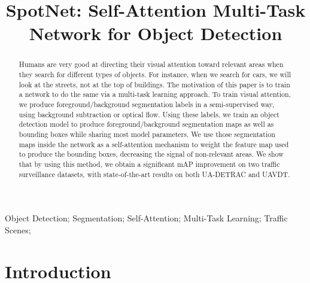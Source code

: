 \documentclass[10pt, conference, compsocconf]{IEEEtran}
\begin{document}
\title{SpotNet: Self-Attention Multi-Task Network for Object Detection}




\author{
\and
{}
}






\maketitle

\begin{abstract}

Humans are very good at directing their visual attention toward relevant areas when they search for different types of objects. For instance, when we search for cars, we will look at the streets, not at the top of buildings. The motivation of this paper is to train a network to do the same via a multi-task learning approach. To train visual attention, we produce foreground/background segmentation labels in a semi-supervised way, using background subtraction or optical flow. Using these labels, we train an object detection model to produce foreground/background segmentation maps as well as bounding boxes while sharing most model parameters. We use those segmentation maps inside the network as a self-attention mechanism to weight the feature map used to produce the bounding boxes, decreasing the signal of non-relevant areas. We show that by using this method, we obtain a significant mAP improvement on two traffic surveillance datasets, with state-of-the-art results on both UA-DETRAC and UAVDT. 

\end{abstract}

\begin{IEEEkeywords}
Object Detection; Segmentation; Self-Attention; Multi-Task Learning; Traffic Scenes;
\end{IEEEkeywords}

\IEEEpeerreviewmaketitle

\section{Introduction}
\end{document}

